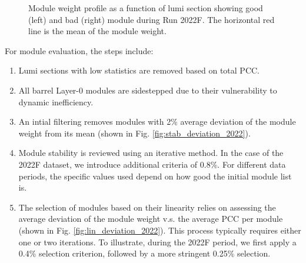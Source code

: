 \begin{figure}[ht]
\begin{subfigure}{0.49\textwidth}
  \label{fig:sub2}
\end{subfigure}
\caption[Good/Bad module weight profile]{Module weight profile as a function of lumi section showing good (left) and bad (right) module during Run 2022F. The horizontal red line is the mean of the module weight.}
\label{fig:test}
\end{figure}



For module evaluation, the steps include:
\begin{enumerate}
    \item Lumi sections with low statistics are removed based on total PCC.
    \item All barrel Layer-0 modules are sidestepped due to their vulnerability to dynamic inefficiency.
    \item An intial filtering removes modules with 2\% average deviation of the module weight from its mean (shown in Fig. \ref{fig:stab_deviation_2022}). %

    \item Module stability is reviewed using an iterative method. In the case of the 2022F dataset, we introduce additional criteria of 0.8\%. For different data periods, the specific values used depend on how good the initial module list is.

    \item The selection of modules based on their linearity relies on assessing the average deviation of the module weight v.s. the average PCC per module (shown in Fig. \ref{fig:lin_deviation_2022}). This process typically requires either one or two iterations. To illustrate, during the 2022F period, we first apply a 0.4\% selection criterion, followed by a more stringent 0.25\% selection.

\end{enumerate}

